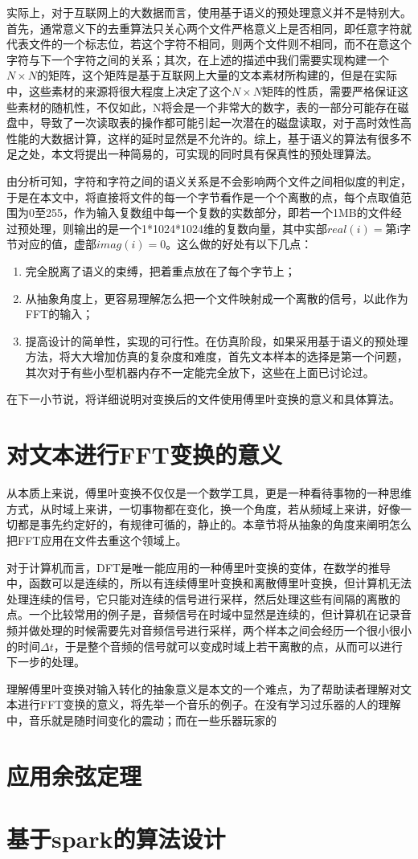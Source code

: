实际上，对于互联网上的大数据而言，使用基于语义的预处理意义并不是特别大。首先，通常意义下的去重算法只关心两个文件严格意义上是否相同，即任意字符就代表文件的一个标志位，若这个字符不相同，则两个文件则不相同，而不在意这个字符与下一个字符之间的关系；其次，在上述的描述中我们需要实现构建一个$N \times N$的矩阵，这个矩阵是基于互联网上大量的文本素材所构建的，但是在实际中，这些素材的来源将很大程度上决定了这个$N \times N$矩阵的性质，需要严格保证这些素材的随机性，不仅如此，N将会是一个非常大的数字，表的一部分可能存在磁盘中，导致了一次读取表的操作都可能引起一次潜在的磁盘读取，对于高时效性高性能的大数据计算，这样的延时显然是不允许的。综上，基于语义的算法有很多不足之处，本文将提出一种简易的，可实现的同时具有保真性的预处理算法。

由分析可知，字符和字符之间的语义关系是不会影响两个文件之间相似度的判定，于是在本文中，将直接将文件的每一个字节看作是一个个离散的点，每个点取值范围为0至255，作为输入复数组中每一个复数的实数部分，即若一个1MB的文件经过预处理，则输出的是一个1*1024*1024维的复数向量，其中实部$real(i)=$第i字节对应的值，虚部$imag(i)=0$。这么做的好处有以下几点：

\begin{enumerate}
\item 完全脱离了语义的束缚，把着重点放在了每个字节上；
\item 从抽象角度上，更容易理解怎么把一个文件映射成一个离散的信号，以此作为FFT的输入；
\item 提高设计的简单性，实现的可行性。在仿真阶段，如果采用基于语义的预处理方法，将大大增加仿真的复杂度和难度，首先文本样本的选择是第一个问题，其次对于有些小型机器内存不一定能完全放下，这些在上面已讨论过。
\end{enumerate}

在下一小节说，将详细说明对变换后的文件使用傅里叶变换的意义和具体算法。

\section{对文本进行FFT变换的意义}
\label{sec:ffttr}

从本质上来说，傅里叶变换不仅仅是一个数学工具，更是一种看待事物的一种思维方式，从时域上来讲，一切事物都在变化，换一个角度，若从频域上来讲，好像一切都是事先约定好的，有规律可循的，静止的。本章节将从抽象的角度来阐明怎么把FFT应用在文件去重这个领域上。

对于计算机而言，DFT是唯一能应用的一种傅里叶变换的变体，在数学的推导中，函数可以是连续的，所以有连续傅里叶变换和离散傅里叶变换，但计算机无法处理连续的信号，它只能对连续的信号进行采样，然后处理这些有间隔的离散的点。一个比较常用的例子是，音频信号在时域中显然是连续的，但计算机在记录音频并做处理的时候需要先对音频信号进行采样，两个样本之间会经历一个很小很小的时间$\Delta t$，于是整个音频的信号就可以变成时域上若干离散的点，从而可以进行下一步的处理。

理解傅里叶变换对输入转化的抽象意义是本文的一个难点，为了帮助读者理解对文本进行FFT变换的意义，将先举一个音乐的例子。在没有学习过乐器的人的理解中，音乐就是随时间变化的震动；而在一些乐器玩家的
\section{应用余弦定理}
\label{sec:applycos}

\section{基于spark的算法设计}
\label{sec:spark}
